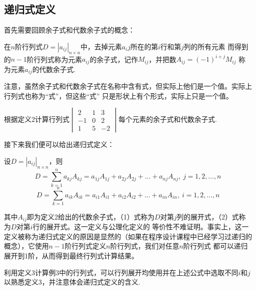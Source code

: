 \subsection{递归式定义}
首先需要回顾余子式和代数余子式的概念：
\begin{definition}
	在$n$阶行列式$D=|a_{ij}|_{n \times n}$中，去掉元素$a_ij$所在的第$i$行和第$j$列的所有元素
	而得到的$n-1$阶行列式称为元素$a_{ij}$的余子式，记作$M_{ij}$，并把数$A_{ij}=(-1)^{i+j}M_{ij}$
	称为元素$a_{ij}$的代数余子式.
\end{definition}
注意，虽然余子式和代数余子式在名称中含有式，但实际上他们是一个值。实际上行列式也称为“式”，但这些“式”
只是形状上有个形式，实际上只是一个值。
\begin{example}
	根据定义$2$计算行列式$\begin{vmatrix}
		2 & 1 & 3 \\
		-1 & 0 & 2 \\
		1 & 5 & -2
	\end{vmatrix}$每个元素的余子式和代数余子式.
\end{example}

接下来我们便可以给出递归式定义：
\begin{definition}
	设$D=|a_{ij}|_{n \times n}$，则
	\begin{equation}
		D=\sum_{k=1}^{n}a_{kj}A_{kj}=a_{1j}A_{1j}+a_{2j}A_{2j}+\dots+a_{nj}A_{nj},\ j=1,2,\dots,n
	\end{equation}
	\begin{equation}
		D=\sum_{k=1}^{n}a_{ik}A_{ik}=a_{i1}A_{i1}+a_{i2}A_{i2}+\dots+a_{in}A_{in},\ i=1,2,\dots,n
	\end{equation}
\end{definition}
其中$A_{ij}$即为定义2给出的代数余子式，（1）式称为$D$对第$j$列的展开式，（2）式称为$D$对第$i$行的展开式。这一定义与公理化定义的
等价性不难证明。事实上，这一定义被称为递归式定义的原因是显然的（如果在程序设计课程中已经学习过递归的概念），它使用$n-1$阶行列式定义$n$阶行列式，我们对任意$n$阶行列式
都可以递归展开到1阶，从而得到最终行列式计算结果。
\begin{example}
	利用定义$3$计算例$3$中的行列式，可以行列展开均使用并在上述公式中选取不同$i$和$j$以熟悉定义$3$，并注意体会递归式定义的含义.
\end{example}


